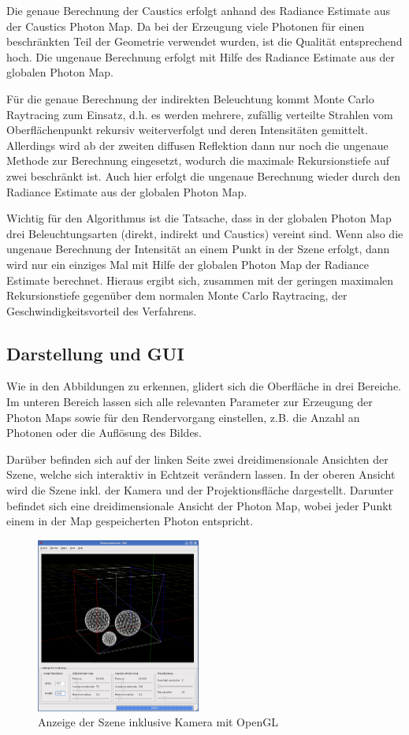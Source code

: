 \documentclass[a4paper,twocolumn,abstracton]{scrartcl}
\begin{document}
Die genaue Berechnung der Caustics erfolgt anhand des Radiance Estimate aus der Caustics Photon Map. Da bei der Erzeugung viele Photonen für einen beschränkten Teil der Geometrie verwendet wurden, ist die Qualität entsprechend hoch. Die ungenaue Berechnung erfolgt mit Hilfe des Radiance Estimate aus der globalen Photon Map.

Für die genaue Berechnung der indirekten Beleuchtung kommt Monte Carlo Raytracing zum Einsatz, d.h. es werden mehrere, zufällig verteilte Strahlen vom Oberflächenpunkt rekursiv weiterverfolgt und deren Intensitäten gemittelt. Allerdings wird ab der zweiten diffusen Reflektion dann nur noch die ungenaue Methode zur Berechnung eingesetzt, wodurch die maximale Rekursionstiefe auf zwei beschränkt ist. Auch hier erfolgt die ungenaue Berechnung wieder durch den Radiance Estimate aus der globalen Photon Map.

Wichtig für den Algorithmus ist die Tatsache, dass in der globalen Photon Map drei Beleuchtungsarten (direkt, indirekt und Caustics) vereint sind. Wenn also die ungenaue Berechnung der Intensität an einem Punkt in der Szene erfolgt, dann wird nur ein einziges Mal mit Hilfe der globalen Photon Map der Radiance Estimate berechnet. Hieraus ergibt sich, zusammen mit der geringen maximalen Rekursionstiefe gegenüber dem normalen Monte Carlo Raytracing, der Geschwindigkeitsvorteil des Verfahrens.

\subsection{Darstellung und GUI}
Wie in den Abbildungen zu erkennen, glidert sich die Oberfläche in drei Bereiche. Im unteren Bereich lassen sich alle relevanten Parameter zur Erzeugung der Photon Maps sowie für den Rendervorgang einstellen, z.B. die Anzahl an Photonen oder die Auflösung des Bildes. 

Darüber befinden sich auf der linken Seite zwei dreidimensionale Ansichten der Szene, welche sich interaktiv in Echtzeit verändern lassen. In der oberen Ansicht wird die Szene inkl. der Kamera und der Projektionsfläche dargestellt. Darunter befindet sich eine dreidimensionale Ansicht der Photon Map, wobei jeder Punkt einem in der Map gespeicherten Photon entspricht. 

\begin{figure}[htb]
\centering
\includegraphics[width=0.48\textwidth]{img/geometry}
\caption{Anzeige der Szene inklusive Kamera mit OpenGL}
\label{fig:geometry}
\end{figure}
\end{document}
